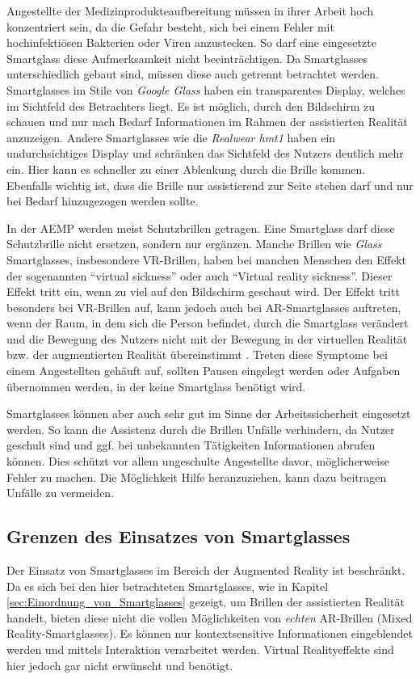 Angestellte der Medizinprodukteaufbereitung müssen in ihrer Arbeit hoch konzentriert sein, da die Gefahr besteht, sich bei einem Fehler mit hochinfektiösen Bakterien oder Viren anzustecken. So darf eine eingesetzte Smartglass diese Aufmerksamkeit nicht beeinträchtigen. Da Smartglasses unterschiedlich gebaut sind, müssen diese auch getrennt betrachtet werden. Smartglasses im Stile von \emph{Google Glass} haben ein transparentes Display, welches im Sichtfeld des Betrachters liegt. Es ist möglich, durch den Bildschirm zu schauen und nur nach Bedarf Informationen im Rahmen der assistierten Realität anzuzeigen. Andere Smartglasses wie die \emph{Realwear hmt1} haben ein undurchsichtiges Display und schränken das Sichtfeld des Nutzers deutlich mehr ein. Hier kann es schneller zu einer Ablenkung durch die Brille kommen. Ebenfalls wichtig ist, dass die Brille nur assistierend zur Seite stehen darf und nur bei Bedarf hinzugezogen werden sollte.

In der AEMP werden meist Schutzbrillen getragen. Eine Smartglass darf diese Schutzbrille nicht ersetzen, sondern nur ergänzen. Manche Brillen wie \emph{Glass} Smartglasses, insbesondere VR-Brillen, haben bei manchen Menschen den Effekt der sogenannten \enquote{virtual sickness} oder auch \enquote{Virtual reality sickness}. Dieser Effekt tritt ein, wenn zu viel auf den Bildschirm geschaut wird. Der Effekt tritt besonders bei VR-Brillen auf, kann jedoch auch bei AR-Smartglasses auftreten, wenn der Raum, in dem sich die Person befindet, durch die Smartglass verändert und die Bewegung des Nutzers nicht mit der Bewegung in der virtuellen Realität bzw. der augmentierten Realität übereinstimmt \cite{Moss2011}. Treten diese Symptome bei einem Angestellten gehäuft auf, sollten Pausen eingelegt werden oder Aufgaben übernommen werden, in der keine Smartglass benötigt wird.

Smartglasses können aber auch sehr gut im Sinne der Arbeitssicherheit eingesetzt werden. So kann die Assistenz durch die Brillen Unfälle verhindern, da Nutzer geschult sind und ggf. bei unbekannten Tätigkeiten Informationen abrufen können. Dies schützt vor allem ungeschulte Angestellte davor, möglicherweise  Fehler zu machen. Die Möglichkeit Hilfe heranzuziehen, kann dazu beitragen Unfälle zu vermeiden.
%
%
%
%
%
%
\subsection{Grenzen des Einsatzes von Smartglasses}
\label{sec:Grenzen_des_Einsatzes_von_Smartglasses}
Der Einsatz von Smartglasses im Bereich der Augmented Reality ist beschränkt. Da es sich bei den hier betrachteten Smartglasses, wie in Kapitel \ref{sec:Einordnung_von_Smartglasses} gezeigt, um Brillen der assistierten Realität handelt, bieten diese nicht die vollen Möglichkeiten von \emph{echten} AR-Brillen (Mixed Reality-Smartglasses). Es können nur kontextsensitive Informationen eingeblendet werden und mittels Interaktion verarbeitet werden. Virtual Realityeffekte sind hier jedoch gar nicht erwünscht und benötigt.

